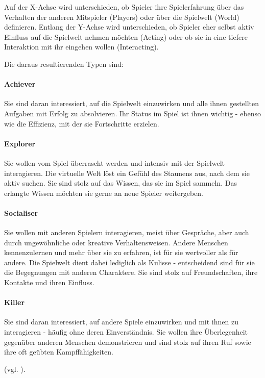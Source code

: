 Auf der X-Achse wird unterschieden, ob Spieler ihre Spielerfahrung über das Verhalten der anderen Mitspieler (Players) oder über die Spielwelt (World) definieren. Entlang der Y-Achse wird unterschieden, ob Spieler eher selbst aktiv Einfluss auf die Spielwelt nehmen möchten (Acting) oder ob sie in eine tiefere Interaktion mit ihr eingehen wollen (Interacting).

Die daraus resultierenden Typen sind:
\paragraph{Achiever}
Sie sind daran interessiert, auf die Spielwelt einzuwirken und alle ihnen gestellten Aufgaben mit Erfolg zu absolvieren. Ihr Status im Spiel ist ihnen wichtig - ebenso wie die Effizienz, mit der sie Fortschritte erzielen.

\paragraph{Explorer}
Sie wollen vom Spiel überrascht werden und intensiv mit der Spielwelt interagieren. Die virtuelle Welt löst ein Gefühl des Staunens aus, nach dem sie aktiv suchen. Sie sind stolz auf das Wissen, das sie im Spiel sammeln. Das erlangte Wissen möchten sie gerne an neue Spieler weitergeben.

\paragraph{Socialiser}
Sie wollen mit anderen Spielern interagieren, meist über Gespräche, aber auch durch ungewöhnliche oder kreative Verhaltensweisen. Andere Menschen kennenzulernen und mehr über sie zu erfahren, ist für sie wertvoller als für andere. Die Spielwelt dient dabei lediglich als Kulisse - entscheidend sind für sie die Begegnungen mit anderen Charaktere. Sie sind stolz auf Freundschaften, ihre Kontakte und ihren Einfluss.

\paragraph{Killer}
Sie sind daran interessiert, auf andere Spiele einzuwirken und mit ihnen zu interagieren - häufig ohne deren Einverständnis. Sie wollen ihre Überlegenheit gegenüber anderen Menschen demonstrieren und sind stolz auf ihren Ruf sowie ihre oft geübten Kampffähigkeiten.

(vgl. \cite{bartle_hearts_1996}).

